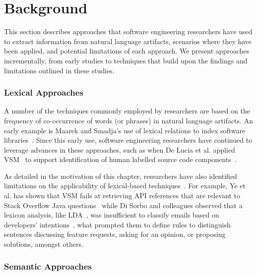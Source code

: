 \clearpage

\section{Background}
\label{cp5:background}


This section describes approaches that software engineering researchers have used to extract information from natural language artifacts, scenarios where they have been applied, and potential limitations of each approach. We present approaches incrementally, from early studies to techniques that build upon the findings
and limitations outlined in these studies.



\subsubsection{Lexical Approaches}


A number of the techniques commonly employed by researchers are based on the
frequency of co-occurrence of words (or phrases) in natural language artifacts. 
An early example is Maarek and Smadja's use of lexical relations to index
software libraries~\cite{maarek1989}. 
Since this early use, software engineering
researchers have continued to leverage advances in
these approaches, such as when De Lucia et al. applied \acf{VSM}~\cite{DeLucia2012}
to support identification of human labelled source code components~\cite{Lin2021}.



As detailed in the motivation of this chapter, 
researchers have also identified limitations on the applicability of lexical-based techniques~\cite{silva2019, Ye2016, Sorbo2015}. For example, Ye et al. has shown that \acs{VSM} 
fails at retrieving API references that are relevant to Stack Overflow Java questions~\cite{Ye2016} while
Di Sorbo and colleagues observed that a lexicon analysis, like \acs{LDA}~\cite{blei2003latent}, was insufficient to classify emails based on developers' intentions~\cite{Sorbo2015}, what prompted them 
to define rules to
distinguish sentences discussing feature requests, asking for an
opinion, or proposing solutions, amongst others.



\subsubsection{Semantic Approaches}



